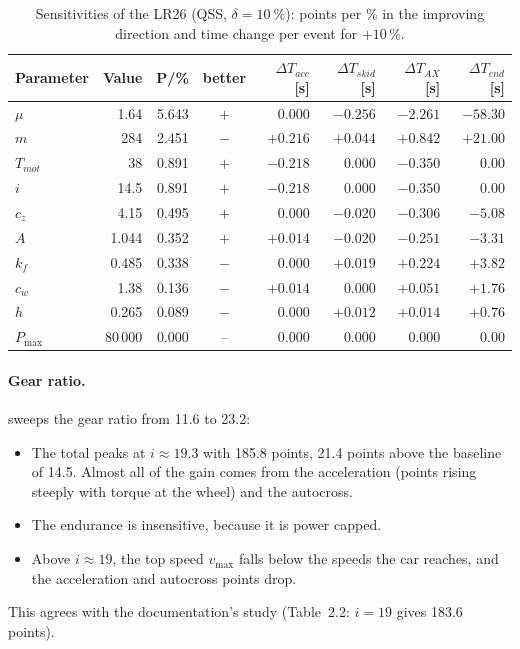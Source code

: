 \documentclass[11pt]{article}
\begin{document}
\begin{table}[t]
\centering\small
\caption{Sensitivities of the LR26 (QSS, $\delta = \SI{10}{\%}$): points per \% in the improving direction and
time change per event for $+10\,\%$.}
\label{tab:sens}
\begin{tabular}{@{}lrrcrrrr@{}}
\toprule
Parameter & Value & P/\% & better & $\Delta T_{acc}$ [s] & $\Delta T_{skid}$ [s] & $\Delta T_{AX}$ [s] & $\Delta T_{end}$ [s]\\
\midrule
$\mu$ & 1.64 & 5.643 & $+$ & 0.000 & $-0.256$ & $-2.261$ & $-58.30$\\
$m$ & 284 & 2.451 & $-$ & $+0.216$ & $+0.044$ & $+0.842$ & $+21.00$\\
$T_{mot}$ & 38 & 0.891 & $+$ & $-0.218$ & 0.000 & $-0.350$ & 0.00\\
$i$ & 14.5 & 0.891 & $+$ & $-0.218$ & 0.000 & $-0.350$ & 0.00\\
$c_z$ & 4.15 & 0.495 & $+$ & 0.000 & $-0.020$ & $-0.306$ & $-5.08$\\
$A$ & 1.044 & 0.352 & $+$ & $+0.014$ & $-0.020$ & $-0.251$ & $-3.31$\\
$k_f$ & 0.485 & 0.338 & $-$ & 0.000 & $+0.019$ & $+0.224$ & $+3.82$\\
$c_w$ & 1.38 & 0.136 & $-$ & $+0.014$ & 0.000 & $+0.051$ & $+1.76$\\
$h$ & 0.265 & 0.089 & $-$ & 0.000 & $+0.012$ & $+0.014$ & $+0.76$\\
$P_{\max}$ & 80\,000 & 0.000 & -- & 0.000 & 0.000 & 0.000 & 0.00\\
\bottomrule
\end{tabular}
\end{table}

\paragraph{Gear ratio.}  sweeps the gear ratio from 11.6 to 23.2:
\begin{itemize}
  \item The total peaks at $i\approx19.3$ with 185.8 points, 21.4 points above the baseline of 14.5. Almost all of
        the gain comes from the acceleration (points rising steeply with torque at the wheel) and the autocross.
  \item The endurance is insensitive, because it is power capped.
  \item Above $i\approx19$, the top speed $v_{\max}$ falls below the speeds the car reaches, and the acceleration
        and autocross points drop.
\end{itemize}
This agrees with the documentation's study (Table~2.2: $i=19$ gives 183.6 points).
\end{document}
